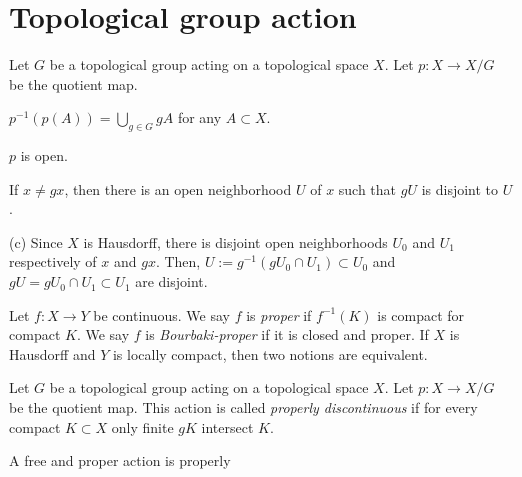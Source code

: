 \documentclass[12pt]{article}
\begin{document}
\tableofcontents

\section{Topological group action}


\begin{prb}
Let $G$ be a topological group acting on a topological space $X$.
Let $p:X\to X/G$ be the quotient map.

\begin{parts}
\item $p^{-1}(p(A))=\bigcup_{g\in G}gA$ for any $A\subset X$.
\item $p$ is open.
\item If $x\ne gx$, then there is an open neighborhood $U$ of $x$ such that $gU$ is disjoint to $U$.
\end{parts}
\end{prb}
\begin{pf}
(c)
Since $X$ is Hausdorff, there is disjoint open neighborhoods $U_0$ and $U_1$ respectively of $x$ and $gx$.
Then, $U:=g^{-1}(gU_0\cap U_1)\subset U_0$ and $gU=gU_0\cap U_1\subset U_1$ are disjoint.
\end{pf}

\begin{prb}
Let $f:X\to Y$ be continuous.
We say $f$ is \emph{proper} if $f^{-1}(K)$ is compact for compact $K$.
We say $f$ is \emph{Bourbaki-proper} if it is closed and proper.
If $X$ is Hausdorff and $Y$ is locally compact, then two notions are equivalent.
\end{prb}

\begin{prb}
Let $G$ be a topological group acting on a topological space $X$.
Let $p:X\to X/G$ be the quotient map.
This action is called \emph{properly discontinuous} if for every compact $K\subset X$ only finite $gK$ intersect $K$.
\begin{parts}
\item A free and proper action is properly
\end{parts}
\end{prb}
\end{document}
